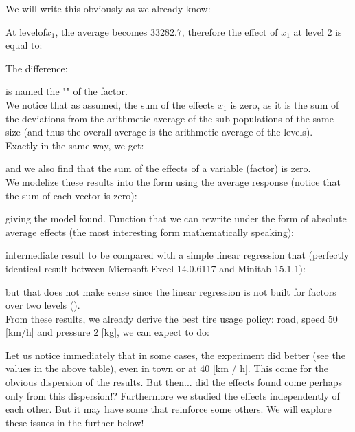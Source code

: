 	We will write this obviously as we already know:
	
	At levelof$x_1$, the average becomes $33282.7$, therefore the effect of $x_1$ at level $2$ is equal to:
	
	The difference:
	
	is named the "" of the factor.\\
	
	We notice that as assumed, the sum of the effects $x_1$ is zero, as it is the sum of the deviations from the arithmetic average of the sub-populations of the same size (and thus the overall average is the arithmetic average of the levels).\\
	
	Exactly in the same way, we get:
	
	and we also find that the sum of the effects of a variable (factor) is zero.\\

	We modelize these results into the form using the average response (notice that the sum of each vector is 
zero):
	
	giving the model found. Function that we can rewrite under the form of absolute average effects (the most interesting form mathematically speaking):
	
	intermediate result to be compared with a simple linear regression that (perfectly identical result between Microsoft Excel 14.0.6117 and Minitab 15.1.1):
	
	but that does not make sense since the linear regression is not built for factors over two levels ().\\

	From these results, we already derive the best tire usage policy: road, speed $50$ [km/h] and pressure $2$ [kg], we can expect to do:
	
	Let us notice immediately that in some cases, the experiment did better (see the values in the above table), even in town or at $40$ [km / h]. This come for the obvious dispersion of the results. But then... did the effects found come perhaps only from this dispersion!? Furthermore we studied the effects independently of each other. But it may have some that reinforce some others. We will explore these issues in the further below!\\
	
